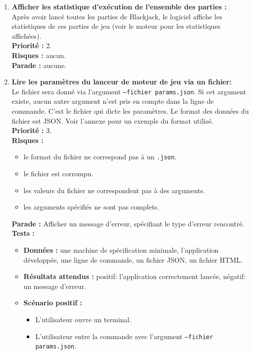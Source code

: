 \documentclass{article}
\newcommand{\code}[1]{\colorbox{light-gray}{\texttt{#1}}}
\begin{document}
\begin{enumerate}
    \item \textbf{Afficher les statistique d'exécution de l'ensemble des parties :} \\
    Après avoir lancé toutes les parties de Blackjack, le logiciel affiche les statistiques de ces parties de jeu (voir le moteur pour les statistiques affichées). \\
    \textbf{Priorité :} 2. \\
    \textbf{Risques :} aucun. \\
    \textbf{Parade :} aucune.

    \item \textbf{Lire les paramètres du lanceur de moteur de jeu via un fichier:}\\
    Le fichier sera donné via l'argument \code{--fichier params.json}. Si cet argument existe, aucun autre argument n'est pris en compte dans la ligne de commande. C'est le fichier qui dicte les paramètres. Le format des données du fichier est JSON. Voir l'annexe pour un exemple du format utilisé. \\
    \textbf{Priorité :} 3. \\
    \textbf{Risques :}
    \begin{itemize}
        \item le format du fichier ne correspond pas à un \code{.json}.
        \item le fichier est corrompu.
        \item les valeurs du fichier ne correspondent pas à des arguments.
        \item les arguments spécifiés ne sont pas complets.
    \end{itemize}
    \textbf{Parade :} Afficher un message d'erreur, spécifiant le type d'erreur rencontré.\\
    \textbf{Tests :}
    \begin{itemize}
        \item \textbf{Données :} une machine de spécification minimale, l'application développée, une ligne de commande, un fichier JSON, un fichier HTML.
        \item \textbf{Résultats attendus :} positif: l'application correctement lancée, négatif: un message d'erreur.
        \item \textbf{Scénario positif :}
        \begin{itemize}
            \item L’utilisateur ouvre un terminal.
            \item L’utilisateur entre la commande avec l'argument \code{--fichier params.json}.

\end{itemize}
\end{itemize}
\end{enumerate}
\end{document}
